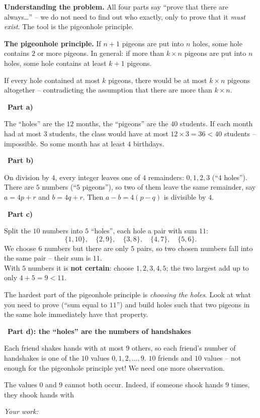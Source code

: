 \documentclass[11pt]{article}
\newif\ifsol \solfalse
\newcommand{\StuProb}[2]{\begin{probboxS}{#1}{#2}\StuProbBody\end{probboxS}}
\newcommand{\probsol}[1]{%
  \begin{lrbox}{\solmeasure}\begin{minipage}{\dimexpr\linewidth-24pt\relax}#1\end{minipage}\end{lrbox}%
  \ifsol
    \begin{solbox}#1\end{solbox}%
  \else
    \setlength{\solht}{\dimexpr\ht\solmeasure+\dp\solmeasure+0.85cm\relax}%
    \ifdim\solht<1.35cm\setlength{\solht}{1.35cm}\fi
    \ifdim\solht>\StudentMaxWork\setlength{\solht}{\StudentMaxWork}\fi
    \par\noindent\begin{minipage}{\linewidth}%
    \expandafter\StuProb\StuProbArgs
    \begin{tcolorbox}[colback=white,colframe=Line,boxrule=0.8pt,arc=5pt,
      left=8pt,right=8pt,top=4pt,bottom=4pt,height=\solht]{\footnotesize\color{Slate}\itshape\WorkWord}\end{tcolorbox}%
    \end{minipage}\par\medskip
  \fi}
\newlength{\StudentMaxWork}\setlength{\StudentMaxWork}{4.5cm}
\newcommand{\step}[2]{\par\smallskip\noindent{\bfseries\color{tmBlue!85!black}\StepWord~#1.}\ {\bfseries #2}\par\nopagebreak}
\def\WorkWord{Your work:}
\def\StepWord{Step}
\begin{document}
\probsol{
\textbf{Understanding the problem.} All four parts say ``prove that there are always\dots'' -- we do not need to find out who exactly,
only to prove that it \emph{must exist}. The tool is the pigeonhole principle.
\begin{recallbox}\textbf{The pigeonhole principle.} If $n + 1$ pigeons are put into $n$ holes, some hole contains $2$ or more pigeons. In
general: if more than $k\times n$ pigeons are put into $n$ holes, some hole contains at least $k + 1$ pigeons.\end{recallbox}
\begin{proofbox}If every hole contained at most $k$ pigeons, there would be at most $k\times n$ pigeons altogether -- contradicting the
assumption that there are more than $k\times n$.\end{proofbox}
\step{1}{Part a)}
The ``holes'' are the $12$ months, the ``pigeons'' are the $40$ students. If each month had at most $3$ students, the class would have at
most $12\times 3 = 36 < 40$ students -- impossible. So some month has at least $4$ birthdays.
\step{2}{Part b)}
On division by $4$, every integer leaves one of $4$ remainders: $0, 1, 2, 3$ (``$4$ holes''). There are $5$ numbers (``$5$ pigeons''),
so two of them leave the same remainder, say $a = 4p + r$ and $b = 4q + r$. Then $a - b = 4(p - q)$ is divisible by $4$.
\step{3}{Part c)}
Split the $10$ numbers into $5$ ``holes'', each hole a pair with sum $11$:
\[ \{1, 10\},\quad \{2, 9\},\quad \{3, 8\},\quad \{4, 7\},\quad \{5, 6\}. \]
We choose $6$ numbers but there are only $5$ pairs, so two chosen numbers fall into the same pair -- their sum is $11$.\\
With $5$ numbers it is \textbf{not certain}: choose $1, 2, 3, 4, 5$; the two largest add up to only $4 + 5 = 9 < 11$.
\begin{tipbox}The hardest part of the pigeonhole principle is \emph{choosing the holes}. Look at what you need to prove (``sum equal to
$11$'') and build holes such that two pigeons in the same hole immediately have that property.\end{tipbox}
\step{4}{Part d): the ``holes'' are the numbers of handshakes}
Each friend shakes hands with at most $9$ others, so each friend's number of handshakes is one of the $10$ values $0, 1, 2, \dots, 9$.
$10$ friends and $10$ values -- not enough for the pigeonhole principle yet! We need one more observation.
\begin{proofbox}The values $0$ and $9$ cannot both occur. Indeed, if someone shook hands $9$ times, they shook hands with

\end{proofbox}}
\end{document}
